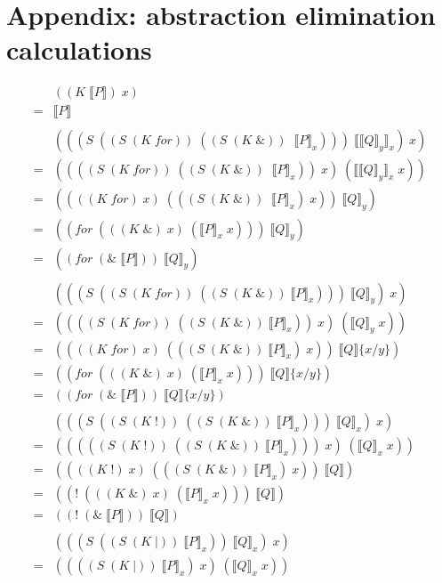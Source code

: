 \documentclass[a4paper,UKenglish]{lipics-v2016}
\newcommand{\interp}[1]{\llbracket #1 \rrbracket}
\begin{document}
\section{Appendix: abstraction elimination calculations}
\[\begin{array}{rl}
  & ((K\; \interp{P})\; x) \\
  = & \interp{P}\\
  \\
  
  & (((S\; ((S\; (K\; for))\; ((S\; (K\; \&))\; \; \interp{P}_x)))\; \interp{\interp{Q}_y}_x)\; x)\\
  =&  ((((S\; (K\; for))\; ((S\; (K\; \&))\; \; \interp{P}_x))\; x)\; (\interp{\interp{Q}_y}_x\; x))\\
  =&  ((((K\; for)\; x)\; (((S\; (K\; \&))\; \; \interp{P}_x)\; x))\; \interp{Q}_y)\\
  =&  ((for\; (((K\; \&)\; x)\; (\interp{P}_x\; x)))\; \interp{Q}_y)\\
  =&  ((for\; (\&\; \interp{P}))\; \interp{Q}_y)\\
  \\
  & (((S\; ((S\; (K\; for))\; ((S\; (K\; \&))\; \interp{P}_x)))\; \interp{Q}_y)\; x)\\
  =&  ((((S\; (K\; for))\; ((S\; (K\; \&))\; \interp{P}_x))\; x)\; (\interp{Q}_y\; x))\\
  =&  ((((K\; for)\; x)\; (((S\; (K\; \&))\; \interp{P}_x)\; x))\; \interp{Q}\{x/y\})\\
  =&  ((for\; (((K\; \&)\; x)\; (\interp{P}_x\; x)))\; \interp{Q}\{x/y\})\\
  =&  ((for\; (\&\; \interp{P}))\; \interp{Q}\{x/y\})\\
  \\
  & (((S\; ((S\; (K\; !))\; ((S\; (K\; \&))\; \interp{P}_x)))\; \interp{Q}_x)\; x)\\
  =&  (((((S\; (K\; !))\; ((S\; (K\; \&))\; \interp{P}_x)))\; x)\; (\interp{Q}_x\; x))\\
  =&  ((((K\; !)\; x)\; (((S\; (K\; \&))\; \interp{P}_x)\; x))\; \interp{Q})\\
  =&  ((!\; (((K\; \&)\; x)\; (\interp{P}_x\; x)))\; \interp{Q})\\
  =&  ((!\; (\&\; \interp{P}))\; \interp{Q})\\
  \\
  & (((S\; ((S\; (K\; |))\; \interp{P}_x))\; \interp{Q}_x)\; x)\\
  =& ((((S\; (K\; |))\; \interp{P}_x)\; x)\; (\interp{Q}_x\; x))\\

\end{array}\]
\end{document}
